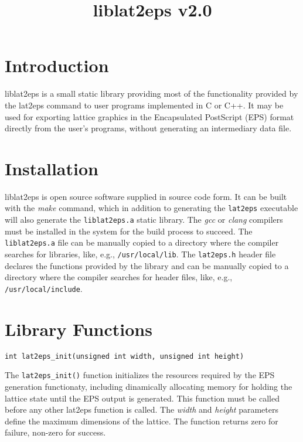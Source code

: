 \documentclass[a4paper]{article}
\title{\vspace{-5ex}liblat2eps v2.0}
\author{}
\date{\vspace{-5ex}}
\begin{document}
\maketitle


\section{Introduction}

liblat2eps is a small static library providing most of the functionality provided by the lat2eps command to user programs implemented in C or C++. It may be used for exporting lattice graphics in the Encapsulated PostScript (EPS) format directly from the user's programs, without generating an intermediary data file.
\bigbreak

\section{Installation}

liblat2eps is open source software supplied in source code form. It can be built with the \textit{make} command, which in addition to generating the \texttt{lat2eps} executable will also generate the \texttt{liblat2eps.a} static library. The \textit{gcc} or \textit{clang} compilers must be installed in the system for the build process to succeed. The \texttt{liblat2eps.a} file can be manually copied to a directory where the compiler searches for libraries, like, e.g., \texttt{/usr/local/lib}. The \texttt{lat2eps.h} header file declares the functions provided by the library and can be manually copied to a directory where the compiler searches for header files, like, e.g., \texttt{/usr/local/include}.
\bigbreak


\section{Library Functions}


\texttt{int lat2eps\_init(unsigned int width, unsigned int height)}
\bigbreak

The \texttt{lat2eps\_init()} function initializes the resources required by the EPS generation functionaty, including dinamically allocating memory for holding the lattice state until the EPS output is generated. This function must be called before any other lat2eps function is called. The \textit{width} and \textit{height} parameters define the maximum dimensions of the lattice. The function returns zero for failure, non-zero for success.
\bigbreak\bigbreak
\end{document}

